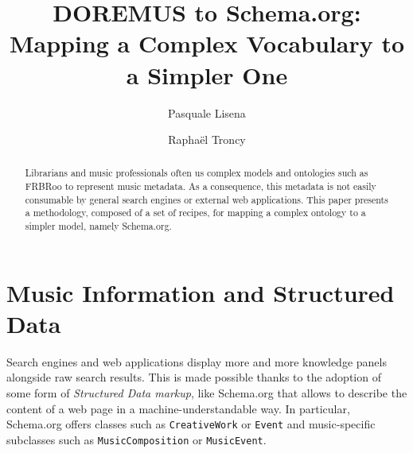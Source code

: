 \documentclass{llncs}
\begin{document}
\title{DOREMUS to Schema.org: Mapping a Complex Vocabulary to a Simpler One}

\author{Pasquale Lisena \and Rapha\"el Troncy}

\maketitle


\begin{abstract}
Librarians and music professionals often us complex models and ontologies such as FRBRoo to represent music metadata. As a consequence, this metadata is not easily consumable by general search engines or external web applications. This paper presents a methodology, composed of a set of recipes, for mapping a complex ontology to a simpler model, namely Schema.org.

\end{abstract}


\section{Music Information and Structured Data}
\label{sec:introduction}
Search engines and web applications display more and more knowledge panels alongside raw search results. This is made possible thanks to the adoption of some form of \textit{Structured Data markup}, like Schema.org \cite{guha2015schema} that allows to describe the content of a web page in a machine-understandable way. In particular, Schema.org offers classes such as \texttt{CreativeWork} or \texttt{Event} and music-specific subclasses such as \texttt{MusicComposition} or \texttt{MusicEvent}.
\end{document}

